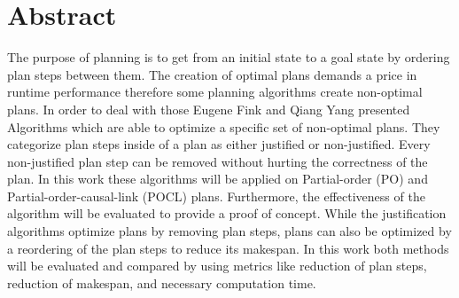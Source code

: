 \chapter*{Abstract}


The purpose of planning is to get from an initial state to a goal state by ordering plan steps between them.
The creation of optimal plans demands a price in runtime performance therefore some planning algorithms 
create non-optimal plans.
In order to deal with those Eugene Fink and Qiang Yang presented Algorithms which are able to optimize a specific set of non-optimal plans.
They categorize plan steps inside of a plan as either justified or non-justified.
Every non-justified plan step can be removed without hurting the correctness of the plan.
In this work these algorithms will be applied on Partial-order (PO) and Partial-order-causal-link (POCL) plans.
Furthermore, the effectiveness of the algorithm will be evaluated to provide a proof of concept. 
While the justification algorithms optimize plans by removing plan steps, plans can also be optimized
by a reordering of the plan steps to reduce its makespan.
In this work both methods will be evaluated and compared by using metrics like reduction of plan steps, 
reduction of makespan, and necessary computation time. 